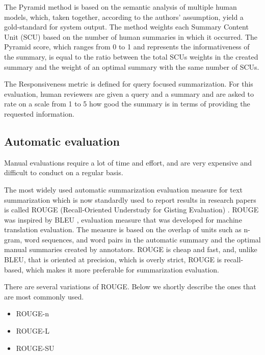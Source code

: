 \documentclass[11pt,a4paper,onecolumn]{article}
\begin{document}
The Pyramid method \cite{nenkova2007pyramid} is based on the semantic analysis of multiple human models, which, taken together, according to the authors' assumption, yield a gold-standard for system output.
The method weights each Summary Content Unit (SCU) based on the number of human summaries in which it occurred.
The Pyramid score, which ranges from 0 to 1 and represents the informativeness of the summary, is equal to the ratio between the total SCUs weights in the created summary and the weight of an optimal summary with the same number of SCUs.

The Responsiveness metric is defined for query focused summarization.
For this evaluation, human reviewers are given a query and a summary and are asked to rate on a scale from 1 to 5 how good the summary is in terms of providing the requested information.

\subsection{Automatic evaluation}
Manual evaluations require a lot of time and effort, and are very expensive and difficult to conduct on a regular basis.

The most widely used automatic summarization evaluation measure for text summarization which is now standardly used to report results in research papers is called ROUGE (Recall-Oriented Understudy for Gisting Evaluation) \cite{lin2004rouge}.
ROUGE was inspired by BLEU \cite{papineni2002bleu}, evaluation measure that was developed for machine translation evaluation.
The measure is based on the overlap of units such as n-gram, word sequences, and word pairs in the automatic summary and the optimal manual summaries created by annotators.
ROUGE is cheap and fast, and, unlike BLEU, that is oriented at precision, which is overly strict, ROUGE is recall-based, which makes it more preferable for summarization evaluation.

There are several variations of ROUGE. Below we shortly describe the ones that are most commonly used.
\begin{itemize}
\item ROUGE-n
\item ROUGE-L
\item ROUGE-SU
\end{itemize}
\end{document}
